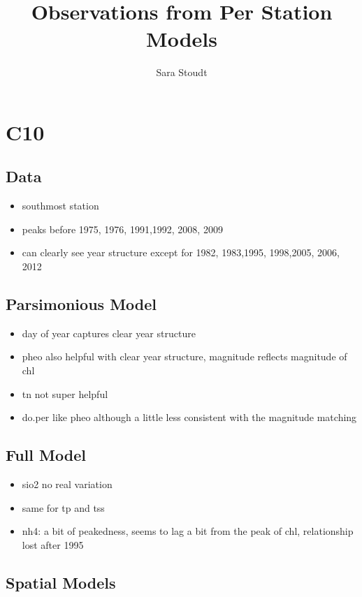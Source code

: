 \documentclass[12pt]{amsart}
\title{Observations from Per Station Models}
\author{Sara Stoudt}
\begin{document}
\maketitle

\section{C10}
\subsection{Data}
\begin{itemize}
\item southmost station
\item peaks before 1975, 1976, 1991,1992, 2008, 2009
\item can clearly see year structure except for 1982, 1983,1995, 1998,2005, 2006, 2012
\end{itemize}

\subsection{Parsimonious Model}

\begin{itemize}
\item day of year captures clear year structure
\item pheo also helpful with clear year structure, magnitude reflects magnitude of chl
\item tn not super helpful
\item do.per like pheo although a little less consistent with the magnitude matching
\end{itemize}

\subsection{Full Model}

\begin{itemize}
\item sio2 no real variation 
\item same for tp and tss
\item nh4: a bit of peakedness, seems to lag a bit from the peak of chl, relationship lost after 1995

\end{itemize}

\subsection{Spatial Models}
\end{document}
